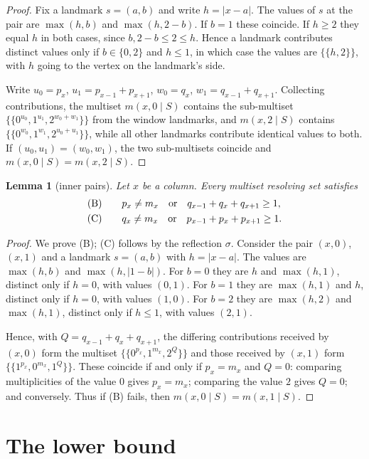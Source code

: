 \documentclass[11pt]{amsart}
\newtheorem{lemma}[lemma]{Lemma}
\theoremstyle{remark}
\newcommand{\ms}[1]{\mathopen{\{\!\{}#1\mathclose{\}\!\}}}
\begin{document}
\begin{proof}
Fix a landmark $s=(a,b)$ and write $h=|x-a|$.  The values of $s$ at the pair are $\max(h,b)$ and $\max(h,2-b)$.  If $b=1$ these coincide.  If $h\ge 2$ they equal $h$ in both cases, since $b,2-b\le 2\le h$.  Hence a landmark contributes distinct values only if $b\in\{0,2\}$ and $h\le 1$, in which case the values are $\ms{h,2}$, with $h$ going to the vertex on the landmark's side.

Write $u_0=p_x$, $u_1=p_{x-1}+p_{x+1}$, $w_0=q_x$, $w_1=q_{x-1}+q_{x+1}$.  Collecting contributions, the multiset $m(x,0\mid S)$ contains the sub-multiset
$\ms{0^{u_0},1^{u_1},2^{w_0+w_1}}$ from the window landmarks, and $m(x,2\mid S)$ contains $\ms{0^{w_0},1^{w_1},2^{u_0+u_1}}$, while all other landmarks contribute identical values to both.  If $(u_0,u_1)=(w_0,w_1)$, the two sub-multisets coincide and $m(x,0\mid S)=m(x,2\mid S)$.
\end{proof}

\begin{lemma}[inner pairs]\label{lem:BC}
Let $x$ be a column.  Every multiset resolving set satisfies
\begin{align*}
 \textup{(B)}&\qquad p_x\ne m_x \quad\text{or}\quad q_{x-1}+q_x+q_{x+1}\ge 1,\\
 \textup{(C)}&\qquad q_x\ne m_x \quad\text{or}\quad p_{x-1}+p_x+p_{x+1}\ge 1 .
\end{align*}
\end{lemma}

\begin{proof}
We prove (B); (C) follows by the reflection $\sigma$.  Consider the pair $(x,0)$, $(x,1)$ and a landmark $s=(a,b)$ with $h=|x-a|$.  The values are $\max(h,b)$ and $\max(h,|1-b|)$.  For $b=0$ they are $h$ and $\max(h,1)$, distinct only if $h=0$, with values $(0,1)$.  For $b=1$ they are $\max(h,1)$ and $h$, distinct only if $h=0$, with values $(1,0)$.  For $b=2$ they are $\max(h,2)$ and $\max(h,1)$, distinct only if $h\le 1$, with values $(2,1)$.

Hence, with $Q=q_{x-1}+q_x+q_{x+1}$, the differing contributions received by $(x,0)$ form the multiset $\ms{0^{p_x},1^{m_x},2^{Q}}$ and those received by $(x,1)$ form $\ms{1^{p_x},0^{m_x},1^{Q}}$.  These coincide if and only if $p_x=m_x$ and $Q=0$: comparing multiplicities of the value $0$ gives $p_x=m_x$; comparing the value $2$ gives $Q=0$; and conversely.  Thus if (B) fails, then $m(x,0\mid S)=m(x,1\mid S)$.
\end{proof}

\section{The lower bound}\label{sec:lower}
\end{document}
